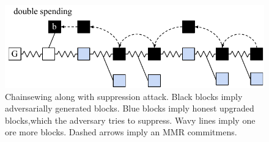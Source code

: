 	\begin{figure}
		\begin{center}
			\includegraphics[width=0.8\columnwidth]{figures/attack_after_update-crop.pdf}
		\end{center}
		\caption{Chainsewing along with suppression attack. Black blocks imply adversarially generated blocks. Blue blocks imply honest upgraded blocks,which the adversary tries to suppress. Wavy lines imply one ore more blocks. Dashed arrows imply an MMR commitmens.}
		\label{fig:combined_chainsewing_flyclient}
	\end{figure}